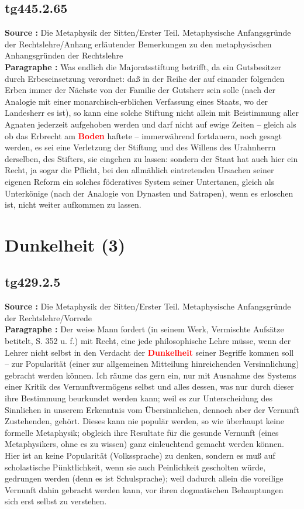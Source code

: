 \documentclass[a4paper,12pt,twoside]{book}
\newcommand{\match}[1]{\textcolor{red}{\textbf{#1}}}
\newcommand{\unnumberedsection}[1]{
	\section*{#1}
	\addcontentsline{toc}{section}{#1}
	\markright{#1}
}
\begin{document}
	\subsection*{tg445.2.65} 
	\textbf{Source : }Die Metaphysik der Sitten/Erster Teil. Metaphysische Anfangsgründe der Rechtslehre/Anhang erläutender Bemerkungen zu den metaphysischen Anhangsgründen der Rechtslehre\\  
	
	\textbf{Paragraphe : }Was endlich die Majoratsstiftung betrifft, da ein Gutsbesitzer durch Erbeseinsetzung verordnet: daß in der Reihe der auf einander folgenden Erben immer der Nächste von der Familie der Gutsherr sein solle (nach der Analogie mit einer monarchisch-erblichen Verfassung eines Staats, wo der Landesherr es ist), so kann eine solche Stiftung nicht allein mit Beistimmung aller Agnaten jederzeit aufgehoben werden und darf nicht auf ewige Zeiten – gleich als ob das Erbrecht am \match{Boden} haftete – immerwährend fortdauern, noch gesagt werden, es sei eine Verletzung der Stiftung und des Willens des Urahnherrn derselben, des Stifters, sie eingehen zu lassen: sondern der Staat hat auch hier ein Recht, ja sogar die Pflicht, bei den allmählich eintretenden Ursachen seiner eigenen Reform ein solches föderatives System seiner Untertanen, gleich als Unterkönige (nach der Analogie von Dynasten und Satrapen), wenn es erloschen ist, nicht weiter aufkommen zu lassen. 
	
	\unnumberedsection{Dunkelheit (3)} 
	\subsection*{tg429.2.5} 
	\textbf{Source : }Die Metaphysik der Sitten/Erster Teil. Metaphysische Anfangsgründe der Rechtslehre/Vorrede\\  
	
	\textbf{Paragraphe : }Der weise Mann fordert (in seinem Werk, Vermischte Aufsätze betitelt, S. 352 u. f.) mit Recht, eine jede philosophische Lehre müsse, wenn der Lehrer nicht selbst in den Verdacht der \match{Dunkelheit} seiner Begriffe kommen soll – zur Popularität (einer zur allgemeinen Mitteilung hinreichenden Versinnlichung) gebracht werden können. Ich räume das gern ein, nur mit Ausnahme des Systems einer Kritik des Vernunftvermögens selbst und alles dessen, was nur durch dieser ihre Bestimmung beurkundet werden kann; weil es zur Unterscheidung des Sinnlichen in unserem Erkenntnis vom Übersinnlichen, dennoch aber der Vernunft Zustehenden, gehört. Dieses kann nie populär werden, so wie überhaupt keine formelle Metaphysik; obgleich ihre Resultate für die gesunde Vernunft (eines Metaphysikers, ohne es zu wissen) ganz einleuchtend gemacht werden können. Hier ist an keine Popularität (Volkssprache) zu denken, sondern es muß auf scholastische Pünktlichkeit, wenn sie auch Peinlichkeit gescholten würde, gedrungen werden (denn es ist Schulsprache); weil dadurch allein die voreilige Vernunft dahin gebracht werden kann, vor ihren dogmatischen Behauptungen sich erst selbst zu verstehen. 
	
\end{document}
